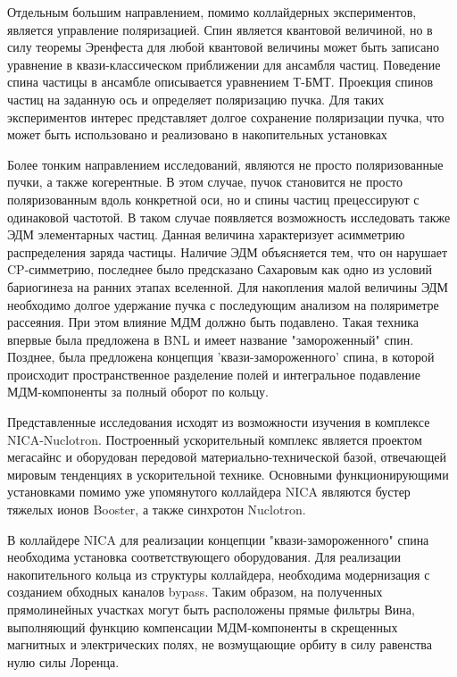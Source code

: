 \par Отдельным большим направлением, помимо коллайдерных экспериментов, является управление поляризацией. Спин является квантовой величиной, но в силу теоремы Эренфеста для любой квантовой величины может быть записано уравнение в квази-классическом приближении для ансамбля частиц. Поведение спина частицы в ансамбле описывается уравнением Т-БМТ. Проекция спинов частиц на заданную ось и определяет поляризацию пучка. Для таких экспериментов интерес представляет долгое сохранение поляризации пучка, что может быть использовано и реализовано в накопительных установках 

\par Более тонким направлением исследований, являются не просто поляризованные пучки, а также когерентные. В этом случае, пучок становится не просто поляризованным вдоль конкретной оси, но и спины частиц прецессируют с одинаковой частотой. В таком случае появляется возможность исследовать также ЭДМ элементарных частиц. Данная величина характеризует асимметрию распределения заряда частицы. Наличие ЭДМ объясняется тем, что он нарушает CP-симметрию, последнее было предсказано Сахаровым как одно из условий бариогинеза на ранних этапах вселенной. Для накопления малой величины ЭДМ необходимо долгое удержание пучка с последующим анализом на поляриметре рассеяния. При этом влияние МДМ должно быть подавлено. Такая техника впервые была предложена в BNL и имеет название "замороженный" спин. Позднее, была предложена концепция 'квази-замороженного' спина, в которой происходит пространственное разделение полей и интегральное подавление МДМ-компоненты за полный оборот по кольцу.

\par Представленные исследования исходят из возможности изучения в комплексе NICA-Nuclotron. Построенный ускорительный комплекс является проектом мегасайнс и оборудован передовой материально-технической базой, отвечающей мировым тенденциях в ускорительной технике. Основными функционирующими установками помимо уже упомянутого коллайдера NICA являются бустер тяжелых ионов Booster, а также синхротон Nuclotron.

\par В коллайдере NICA для реализации концепции "квази-замороженного" спина необходима установка соответствующего оборудования. Для реализации накопительного кольца из структуры коллайдера, необходима модернизация с созданием обходных каналов bypass. Таким образом, на полученных прямолинейных участках могут быть расположены прямые фильтры Вина, выполняющий функцию компенсации МДМ-компоненты в скрещенных магнитных и электрических полях, не возмущающие орбиту в силу равенства нулю силы Лоренца.

